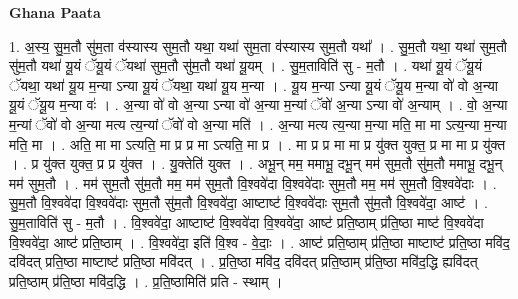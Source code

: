 \documentclass[17pt]{extarticle}
\begin{document}
\textbf{Ghana Paata } \newline

1. अ॒स्य॒ सु॒म॒तौ सु॑म॒ता व॑स्यास्य सुम॒तौ यथा॒ यथा॑ सुम॒ता व॑स्यास्य सुम॒तौ यथा᳚ । . सु॒म॒तौ यथा॒ यथा॑ सुम॒तौ सु॑म॒तौ यथा॑ यू॒यं ॅयू॒यं ॅयथा॑ सुम॒तौ सु॑म॒तौ यथा॑ यू॒यम् । . सु॒म॒ताविति॑ सु - म॒तौ । . यथा॑ यू॒यं ॅयू॒यं ॅयथा॒ यथा॑ यू॒य म॒न्या ऽन्या यू॒यं ॅयथा॒ यथा॑ यू॒य म॒न्या । . यू॒य म॒न्या ऽन्या यू॒यं ॅयू॒य म॒न्या वो॑ वो अ॒न्या यू॒यं ॅयू॒य म॒न्या वः॑ । . अ॒न्या वो॑ वो अ॒न्या ऽन्या वो॑ अ॒न्या म॒न्यां ॅवो॑ अ॒न्या ऽन्या वो॑ अ॒न्याम् । . वो॒ अ॒न्या म॒न्यां ॅवो॑ वो अ॒न्या मत्य त्य॒न्यां ॅवो॑ वो अ॒न्या मति॑ । . अ॒न्या मत्य त्य॒न्या म॒न्या मति॒ मा मा ऽत्य॒न्या म॒न्या मति॒ मा । . अति॒ मा मा ऽत्यति॒ मा प्र प्र मा ऽत्यति॒ मा प्र । . मा प्र प्र मा मा प्र यु॑क्त युक्त॒ प्र मा मा प्र यु॑क्त । . प्र यु॑क्त युक्त॒ प्र प्र यु॑क्त । . यु॒क्तेति॑ युक्त । . अभू॒न् मम॒ ममाभू॒ दभू॒न् मम॑ सुम॒तौ सु॑म॒तौ ममाभू॒ दभू॒न् मम॑ सुम॒तौ । . मम॑ सुम॒तौ सु॑म॒तौ मम॒ मम॑ सुम॒तौ वि॒श्ववे॑दा वि॒श्ववे॑दाः सुम॒तौ मम॒ मम॑ सुम॒तौ वि॒श्ववे॑दाः । . सु॒म॒तौ वि॒श्ववे॑दा वि॒श्ववे॑दाः सुम॒तौ सु॑म॒तौ वि॒श्ववे॑दा॒ आष्टाष्ट॑ वि॒श्ववे॑दाः सुम॒तौ सु॑म॒तौ वि॒श्ववे॑दा॒ आष्ट॑ । . सु॒म॒ताविति॑ सु - म॒तौ । . वि॒श्ववे॑दा॒ आष्टाष्ट॑ वि॒श्ववे॑दा वि॒श्ववे॑दा॒ आष्ट॑ प्रति॒ष्ठाम् प्र॑ति॒ष्ठा माष्ट॑ वि॒श्ववे॑दा वि॒श्ववे॑दा॒ आष्ट॑ प्रति॒ष्ठाम् । . वि॒श्ववे॑दा॒ इति॑ वि॒श्व - वे॒दाः॒ । . आष्ट॑ प्रति॒ष्ठाम् प्र॑ति॒ष्ठा माष्टाष्ट॑ प्रति॒ष्ठा मवि॑द॒ दवि॑दत् प्रति॒ष्ठा माष्टाष्ट॑ प्रति॒ष्ठा मवि॑दत् । . प्र॒ति॒ष्ठा मवि॑द॒ दवि॑दत् प्रति॒ष्ठाम् प्र॑ति॒ष्ठा मवि॑द॒द्धि ह्यवि॑दत् प्रति॒ष्ठाम् प्र॑ति॒ष्ठा मवि॑द॒द्धि । . प्र॒ति॒ष्ठामिति॑ प्रति - स्थाम् । \newline
\end{document}
